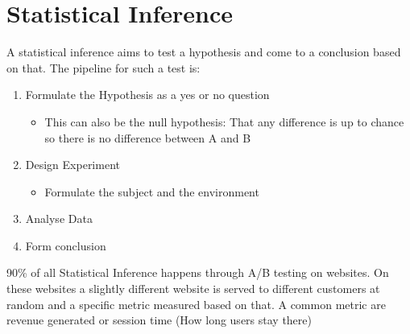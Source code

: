 \documentclass{article}
\begin{document}
	\section{Statistical Inference}
	A statistical inference aims to test a hypothesis and come to a conclusion based on that. The pipeline for such a test is:
	\begin{enumerate}
		\item{Formulate the Hypothesis as a yes or no question}
		\begin{itemize}
			\item{This can also be the null hypothesis: That any difference is up to chance so there is no difference between A and B}
		\end{itemize}
		\item{Design Experiment}
		\begin{itemize}
			\item{Formulate the subject and the environment}
		\end{itemize}
		\item{Analyse Data}
		\item{Form conclusion}
	\end{enumerate}
	90\% of all Statistical Inference happens through A/B testing on websites. On these websites a slightly different website is served to different customers at random and a specific metric measured based on that. A common metric are revenue generated or session time (How long users stay there)
\end{document}
